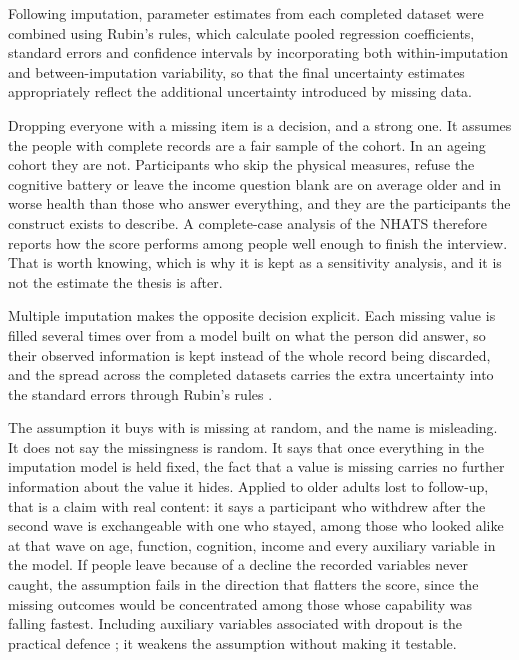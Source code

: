 Following imputation, parameter estimates from each completed dataset were combined using Rubin's rules, which calculate pooled regression coefficients, standard errors and confidence intervals by incorporating both within-imputation and between-imputation variability, so that the final uncertainty estimates appropriately reflect the additional uncertainty introduced by missing data.

\begin{reading}
Dropping everyone with a missing item is a decision, and a strong one. It assumes the people with complete records are a fair sample of the cohort. In an ageing cohort they are not. Participants who skip the physical measures, refuse the cognitive battery or leave the income question blank are on average older and in worse health than those who answer everything, and they are the participants the construct exists to describe. A complete-case analysis of the NHATS therefore reports how the score performs among people well enough to finish the interview. That is worth knowing, which is why it is kept as a sensitivity analysis, and it is not the estimate the thesis is after.

Multiple imputation makes the opposite decision explicit. Each missing value is filled several times over from a model built on what the person did answer, so their observed information is kept instead of the whole record being discarded, and the spread across the completed datasets carries the extra uncertainty into the standard errors through Rubin's rules \citep{rubin_1987}.

The assumption it buys with is missing at random, and the name is misleading. It does not say the missingness is random. It says that once everything in the imputation model is held fixed, the fact that a value is missing carries no further information about the value it hides. Applied to older adults lost to follow-up, that is a claim with real content: it says a participant who withdrew after the second wave is exchangeable with one who stayed, among those who looked alike at that wave on age, function, cognition, income and every auxiliary variable in the model. If people leave because of a decline the recorded variables never caught, the assumption fails in the direction that flatters the score, since the missing outcomes would be concentrated among those whose capability was falling fastest. Including auxiliary variables associated with dropout is the practical defence \citep{vanbuuren_2011}; it weakens the assumption without making it testable.
\end{reading}

